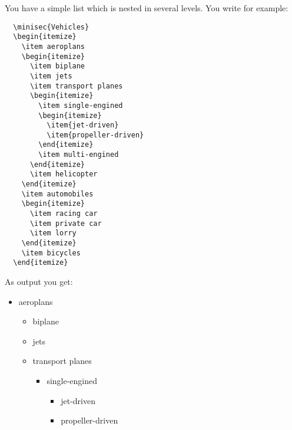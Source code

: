 \begin{Example}
  You have a simple list which is nested in several levels. You write
  for example:
\begin{lstlisting}
  \minisec{Vehicles}
  \begin{itemize}
    \item aeroplans
    \begin{itemize}
      \item biplane
      \item jets
      \item transport planes
      \begin{itemize}
        \item single-engined
        \begin{itemize}
          \item{jet-driven}
          \item{propeller-driven}
        \end{itemize}
        \item multi-engined
      \end{itemize}
      \item helicopter
    \end{itemize}
    \item automobiles
    \begin{itemize}
      \item racing car
      \item private car
      \item lorry
    \end{itemize}
    \item bicycles
  \end{itemize}
\end{lstlisting}
  As output you get:
  \begin{ShowOutput}[\baselineskip]
  \begin{itemize}
    \item aeroplans
    \begin{itemize}
      \item biplane
      \item jets
      \item transport planes
      \begin{itemize}
        \item single-engined
        \begin{itemize}
          \item{jet-driven}
          \item{propeller-driven}
        \end{itemize}

\end{itemize}
\end{itemize}
\end{itemize}
\end{ShowOutput}
\end{Example}

